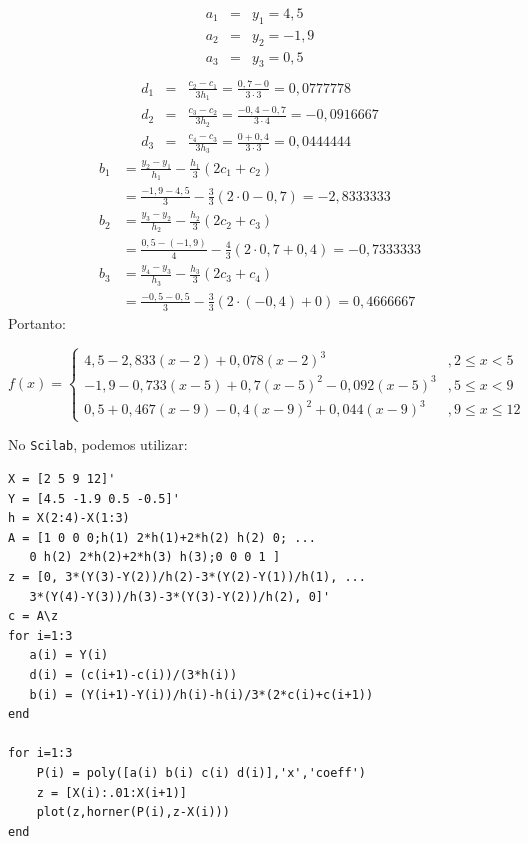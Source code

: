 \documentclass[main.tex]{subfiles}
\begin{document}
\begin{sol}
\begin{eqnarray*}
a_1&=&y_1=4,5\\
a_2&=&y_2=-1,9\\
a_3&=&y_3=0,5\\
\end{eqnarray*}
\begin{eqnarray*}
d_1&=&\frac{c_{2}-c_1}{3h_1}=\frac{0,7-0}{3\cdot 3}=0,0777778\\
d_2&=&\frac{c_{3}-c_2}{3h_2}=\frac{-0,4-0,7}{3\cdot 4}=-0,0916667\\
d_3&=&\frac{c_{4}-c_3}{3h_3}=\frac{0+0,4}{3\cdot 3}=0,0444444
\end{eqnarray*}
\begin{align*}
b_1 &= \frac{y_{2}-y_1}{h_1}-\frac{h_1}{3}(2c_1+c_{2})\\
&= \frac{-1,9-4,5}{3}-\frac{3}{3}(2\cdot 0-0,7)=-2,8333333\\
b_2&= \frac{y_{3}-y_2}{h_2}-\frac{h_2}{3}(2c_2+c_{3})\\
&= \frac{0,5-(-1,9)}{4}-\frac{4}{3}(2\cdot 0,7+0,4)=-0,7333333\\
b_3&= \frac{y_{4}-y_3}{h_3}-\frac{h_3}{3}(2c_3+c_{4})\\
&= \frac{-0,5-0,5}{3}-\frac{3}{3}(2\cdot (-0,4)+0)=0,4666667
\end{align*}
Portanto:
\begin{small}
\begin{equation*}
f(x)=\left\{\begin{array}{ll}
4,5-2,833(x-2)+0,078(x-2)^3 &\!, 2\leq x<5\\
-1,9-0,733(x-5)+0,7(x-5)^2-0,092(x-5)^3 &\!, 5\leq x<9\\
0,5+0,467(x-9)-0,4(x-9)^2+0,044(x-9)^3 &\!, 9\leq x\leq 12
\end{array}\right.
\end{equation*}  
\end{small}

\ifisscilab
No \verb+Scilab+, podemos utilizar:
\begin{verbatim}
X = [2 5 9 12]'
Y = [4.5 -1.9 0.5 -0.5]'
h = X(2:4)-X(1:3)
A = [1 0 0 0;h(1) 2*h(1)+2*h(2) h(2) 0; ...
   0 h(2) 2*h(2)+2*h(3) h(3);0 0 0 1 ]
z = [0, 3*(Y(3)-Y(2))/h(2)-3*(Y(2)-Y(1))/h(1), ...
   3*(Y(4)-Y(3))/h(3)-3*(Y(3)-Y(2))/h(2), 0]'
c = A\z
for i=1:3
   a(i) = Y(i)
   d(i) = (c(i+1)-c(i))/(3*h(i))
   b(i) = (Y(i+1)-Y(i))/h(i)-h(i)/3*(2*c(i)+c(i+1))
end

for i=1:3
    P(i) = poly([a(i) b(i) c(i) d(i)],'x','coeff')
    z = [X(i):.01:X(i+1)]
    plot(z,horner(P(i),z-X(i)))
end
\end{verbatim}
\fi
\end{sol}
\end{document}

